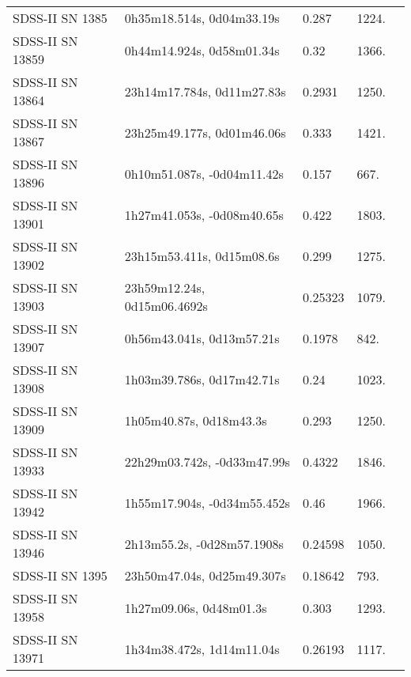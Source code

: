 \begin{longtable}{lllll}
  SDSS-II SN 1385 &      0h35m18.514s, 0d04m33.19s &    0.287 &          1224. &    \citet{2011ApJ...738..162S} \\
 SDSS-II SN 13859 &      0h44m14.924s, 0d58m01.34s &     0.32 &          1366. &    \citet{2011ApJ...738..162S} \\
 SDSS-II SN 13864 &     23h14m17.784s, 0d11m27.83s &   0.2931 &          1250. &    \citet{2011ApJ...738..162S} \\
 SDSS-II SN 13867 &     23h25m49.177s, 0d01m46.06s &    0.333 &          1421. &    \citet{2010ApJ...713.1026D} \\
 SDSS-II SN 13896 &     0h10m51.087s, -0d04m11.42s &    0.157 &           667. &    \citet{2011ApJ...738..162S} \\
 SDSS-II SN 13901 &     1h27m41.053s, -0d08m40.65s &    0.422 &          1803. &    \citet{2011ApJ...738..162S} \\
 SDSS-II SN 13902 &      23h15m53.411s, 0d15m08.6s &    0.299 &          1275. &    \citet{2005ApJS..158..161H} \\
 SDSS-II SN 13903 &    23h59m12.24s, 0d15m06.4692s &  0.25323 &          1079. &    \citet{2016SDSSD.C...0000:} \\
 SDSS-II SN 13907 &      0h56m43.041s, 0d13m57.21s &   0.1978 &           842. &    \citet{2011ApJ...738..162S} \\
 SDSS-II SN 13908 &      1h03m39.786s, 0d17m42.71s &     0.24 &          1023. &    \citet{2010ApJ...713.1026D} \\
 SDSS-II SN 13909 &        1h05m40.87s, 0d18m43.3s &    0.293 &          1250. &    \citet{2010ApJ...713.1026D} \\
 SDSS-II SN 13933 &    22h29m03.742s, -0d33m47.99s &   0.4322 &          1846. &    \citet{2011ApJ...738..162S} \\
 SDSS-II SN 13942 &    1h55m17.904s, -0d34m55.452s &     0.46 &          1966. &    \citet{2011ApJ...738..162S} \\
 SDSS-II SN 13946 &     2h13m55.2s, -0d28m57.1908s &  0.24598 &          1050. &    \citet{2016SDSSD.C...0000:} \\
  SDSS-II SN 1395 &     23h50m47.04s, 0d25m49.307s &  0.18642 &           793. &    \citet{2016SDSSD.C...0000:} \\
 SDSS-II SN 13958 &        1h27m09.06s, 0d48m01.3s &    0.303 &          1293. &    \citet{2010ApJ...713.1026D} \\
 SDSS-II SN 13971 &      1h34m38.472s, 1d14m11.04s &  0.26193 &          1117. &    \citet{2016SDSSD.C...0000:} \\

\end{longtable}
